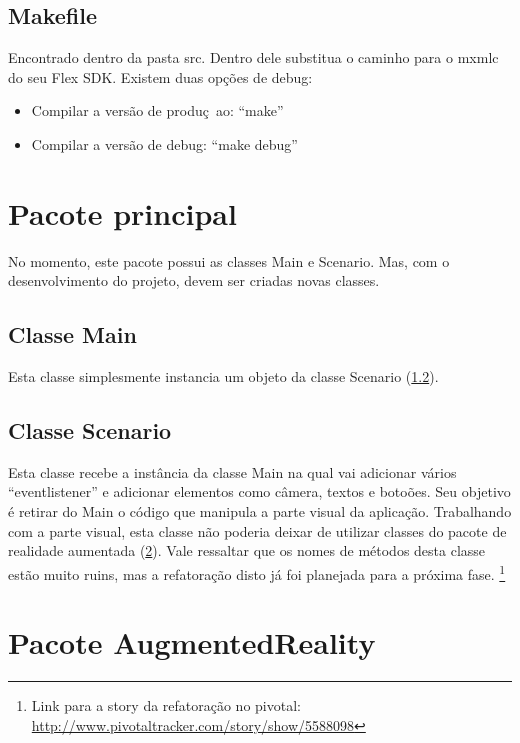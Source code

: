 \documentclass[a4paper,12pt]{book}
\begin{document}
	\subsection{Makefile}
	Encontrado dentro da pasta src. Dentro dele substitua o caminho para o mxmlc do
	seu Flex SDK.
	Existem duas op\c c\~oes de debug:
	\begin{itemize}
	  \item{Compilar a vers\~ao de produ\c c~ao: ``make''}
	  \item{Compilar a vers\~ao de debug: ``make debug''}
	\end{itemize}
	
	\section{Pacote principal}
		\label{sec:pcpacoteaugmentedreality}
		
		No momento, este pacote possui as classes Main e Scenario. Mas, com o
		desenvolvimento do projeto, devem ser criadas novas classes.
		
		\subsection{Classe Main}
		\label{subsec:ecclassemain}
		Esta classe simplesmente instancia um objeto da classe
		Scenario (\ref{subsec:ecclassescenario}).
		
		\subsection{Classe Scenario}
		\label{subsec:ecclassescenario}
		Esta classe recebe a inst\^ancia da classe Main na qual vai adicionar v\'arios
		``eventlistener'' e adicionar elementos como c\^amera, textos e boto\~oes. Seu
		objetivo \'e retirar do Main o c\'odigo que manipula a parte visual da
		aplica\c c\~ao.
		Trabalhando com a parte visual, esta classe n\~ao poderia deixar de utilizar
		classes do pacote de realidade aumentada (\ref{sec:pcpacoteaugmentedreality}).
		Vale ressaltar que os nomes de m\'etodos desta classe est\~ao muito ruins, mas
		a refatora\c c\~ao disto j\'a foi planejada para a pr\'oxima fase.
		\footnote{Link para a story da refatora\c c\~ao no pivotal:	\url{http://www.pivotaltracker.com/story/show/5588098}}
		
	\section{Pacote AugmentedReality}
		\label{sec:pcpacoteaugmentedreality}
		
\end{document}
